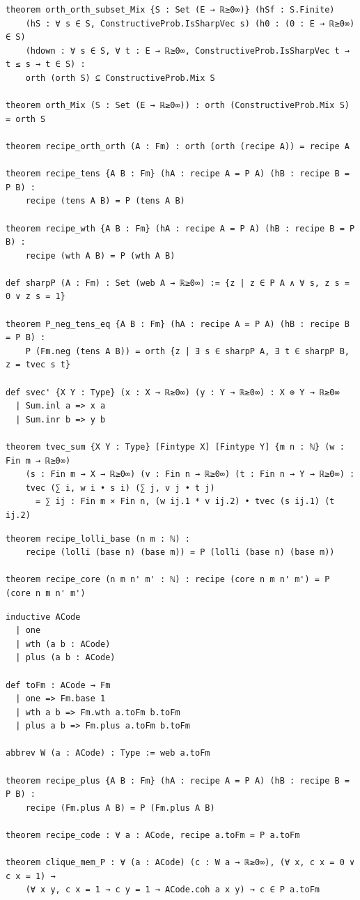 \label{lean:closure}
\begin{lstlisting}
theorem orth_orth_subset_Mix {S : Set (E → ℝ≥0∞)} (hSf : S.Finite)
    (hS : ∀ s ∈ S, ConstructiveProb.IsSharpVec s) (h0 : (0 : E → ℝ≥0∞) ∈ S)
    (hdown : ∀ s ∈ S, ∀ t : E → ℝ≥0∞, ConstructiveProb.IsSharpVec t → t ≤ s → t ∈ S) :
    orth (orth S) ⊆ ConstructiveProb.Mix S

theorem orth_Mix (S : Set (E → ℝ≥0∞)) : orth (ConstructiveProb.Mix S) = orth S

theorem recipe_orth_orth (A : Fm) : orth (orth (recipe A)) = recipe A

theorem recipe_tens {A B : Fm} (hA : recipe A = P A) (hB : recipe B = P B) :
    recipe (tens A B) = P (tens A B)

theorem recipe_wth {A B : Fm} (hA : recipe A = P A) (hB : recipe B = P B) :
    recipe (wth A B) = P (wth A B)

def sharpP (A : Fm) : Set (web A → ℝ≥0∞) := {z | z ∈ P A ∧ ∀ s, z s = 0 ∨ z s = 1}

theorem P_neg_tens_eq {A B : Fm} (hA : recipe A = P A) (hB : recipe B = P B) :
    P (Fm.neg (tens A B)) = orth {z | ∃ s ∈ sharpP A, ∃ t ∈ sharpP B, z = tvec s t}

def svec' {X Y : Type} (x : X → ℝ≥0∞) (y : Y → ℝ≥0∞) : X ⊕ Y → ℝ≥0∞
  | Sum.inl a => x a
  | Sum.inr b => y b

theorem tvec_sum {X Y : Type} [Fintype X] [Fintype Y] {m n : ℕ} (w : Fin m → ℝ≥0∞)
    (s : Fin m → X → ℝ≥0∞) (v : Fin n → ℝ≥0∞) (t : Fin n → Y → ℝ≥0∞) :
    tvec (∑ i, w i • s i) (∑ j, v j • t j)
      = ∑ ij : Fin m × Fin n, (w ij.1 * v ij.2) • tvec (s ij.1) (t ij.2)
\end{lstlisting}

\label{lean:recipe-core}
\begin{lstlisting}
theorem recipe_lolli_base (n m : ℕ) :
    recipe (lolli (base n) (base m)) = P (lolli (base n) (base m))

theorem recipe_core (n m n' m' : ℕ) : recipe (core n m n' m') = P (core n m n' m')
\end{lstlisting}

\label{lean:recipe-code}
\begin{lstlisting}
inductive ACode
  | one
  | wth (a b : ACode)
  | plus (a b : ACode)

def toFm : ACode → Fm
  | one => Fm.base 1
  | wth a b => Fm.wth a.toFm b.toFm
  | plus a b => Fm.plus a.toFm b.toFm

abbrev W (a : ACode) : Type := web a.toFm

theorem recipe_plus {A B : Fm} (hA : recipe A = P A) (hB : recipe B = P B) :
    recipe (Fm.plus A B) = P (Fm.plus A B)

theorem recipe_code : ∀ a : ACode, recipe a.toFm = P a.toFm

theorem clique_mem_P : ∀ (a : ACode) (c : W a → ℝ≥0∞), (∀ x, c x = 0 ∨ c x = 1) →
    (∀ x y, c x = 1 → c y = 1 → ACode.coh a x y) → c ∈ P a.toFm
\end{lstlisting}

